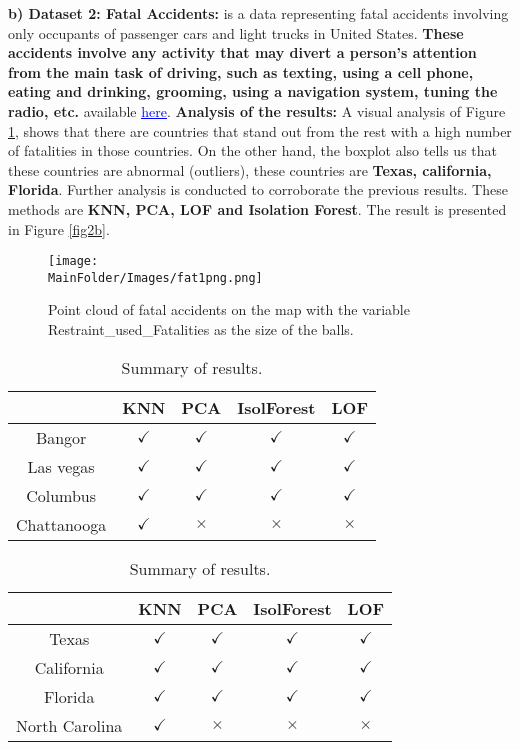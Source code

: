 \afterpage{\FloatBarrier}

\noindent \textbf{b) Dataset 2: Fatal Accidents:}
 is a data representing fatal accidents involving only occupants of passenger cars and light trucks in  United States. \textbf{These accidents involve any activity that may divert a person's attention from the main task of driving, such as texting, using a cell phone, eating and drinking, grooming, using a navigation system, tuning the radio, etc.} available  \href{https://www.bts.dot.gov/content/passenger-car-and-light-truck-occupants-killed-and-restraint-use}{\textcolor{blue}{\underline{here}}}. \newl
\noindent \textbf{Analysis of the results:}
A visual analysis of Figure \ref{fig2}, shows that there are countries that stand out from the rest with a high number of fatalities in those countries. On the other hand, the boxplot  also tells us that these countries are abnormal (outliers), these countries are \textbf{Texas, california, Florida}. Further analysis is conducted to corroborate the previous results. These methods are \textbf{ KNN, PCA, LOF and Isolation Forest}. The result is presented in Figure \ref{fig2b}. 
\begin{figure}[H]
    \centering
    \texttt{[image: \\MainFolder/Images/fat1png.png]}
    \caption{Point cloud of fatal accidents on the map with the variable Restraint\_used\_Fatalities as the size of the balls.}%
    \label{fig2}
\end{figure}
%
%
\begin{table}[ht!]
\centering
 \begin{tabular}{||c c c c c||} 
 \hline
 &  KNN & PCA & IsolForest & LOF\\ [0.5ex] 
 \hline\hline
Bangor & $\checkmark$ & $\checkmark$  & $\checkmark$ & $\checkmark$ \\ 
 Las vegas & $\checkmark$ & $\checkmark$  & $\checkmark$ & $\checkmark$ \\
Columbus & $\checkmark$ & $\checkmark$  & $\checkmark$ & $\checkmark$ \\
 Chattanooga & $\checkmark$ & $\times$  & $\times$ & $\times$ \\ [1ex] 
 \hline
 \end{tabular}
 \caption{Summary of results.}
 \label{fig2w}
\end{table}
\begin{table}
\centering
 \begin{tabular}{||c c c c c||} 
 \hline
 &  KNN & PCA & IsolForest & LOF\\ [0.5ex] 
 \hline\hline
Texas & $\checkmark$ & $\checkmark$  & $\checkmark$ & $\checkmark$ \\ 
 California & $\checkmark$ & $\checkmark$  & $\checkmark$ & $\checkmark$ \\
Florida & $\checkmark$ & $\checkmark$  & $\checkmark$ & $\checkmark$ \\
 North Carolina & $\checkmark$ & $\times$  & $\times$ & $\times$ \\ [1ex] 
 \hline
 \end{tabular}
 \caption{Summary of results.}
\end{table}

